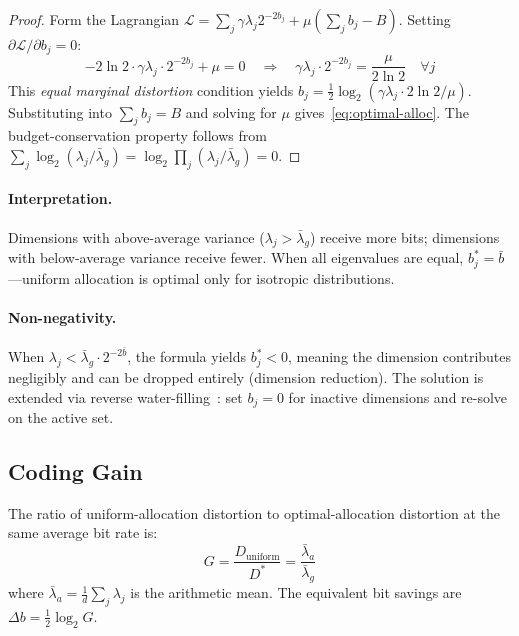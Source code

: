 \begin{proof}
Form the Lagrangian $\mathcal{L} = \sum_j \gamma \lambda_j 2^{-2b_j} + \mu(\sum_j b_j - B)$. Setting $\partial \mathcal{L}/\partial b_j = 0$:
\begin{equation}
    -2\ln 2 \cdot \gamma \lambda_j \cdot 2^{-2b_j} + \mu = 0 \quad \Rightarrow \quad \gamma \lambda_j \cdot 2^{-2b_j} = \frac{\mu}{2\ln 2} \quad \forall j
    \label{eq:equal-marginal}
\end{equation}
This \emph{equal marginal distortion} condition yields $b_j = \frac{1}{2}\log_2(\gamma \lambda_j \cdot 2\ln 2 / \mu)$. Substituting into $\sum_j b_j = B$ and solving for $\mu$ gives~\eqref{eq:optimal-alloc}. The budget-conservation property follows from $\sum_j \log_2(\lambda_j/\bar{\lambda}_g) = \log_2 \prod_j (\lambda_j/\bar{\lambda}_g) = 0$.
\end{proof}

\paragraph{Interpretation.} Dimensions with above-average variance ($\lambda_j > \bar{\lambda}_g$) receive more bits; dimensions with below-average variance receive fewer. When all eigenvalues are equal, $b_j^* = \bar{b}$---uniform allocation is optimal only for isotropic distributions.

\paragraph{Non-negativity.} When $\lambda_j < \bar{\lambda}_g \cdot 2^{-2\bar{b}}$, the formula yields $b_j^* < 0$, meaning the dimension contributes negligibly and can be dropped entirely (dimension reduction). The solution is extended via reverse water-filling~\citep{cover2006}: set $b_j = 0$ for inactive dimensions and re-solve on the active set.

\subsection{Coding Gain}
\label{sec:coding-gain}

\begin{theorem}
\label{thm:coding-gain}
The ratio of uniform-allocation distortion to optimal-allocation distortion at the same average bit rate is:
\begin{equation}
    G = \frac{D_{\text{uniform}}}{D^*} = \frac{\bar{\lambda}_a}{\bar{\lambda}_g}
    \label{eq:coding-gain}
\end{equation}
where $\bar{\lambda}_a = \frac{1}{d}\sum_j \lambda_j$ is the arithmetic mean. The equivalent bit savings are $\Delta b = \frac{1}{2}\log_2 G$.
\end{theorem}

